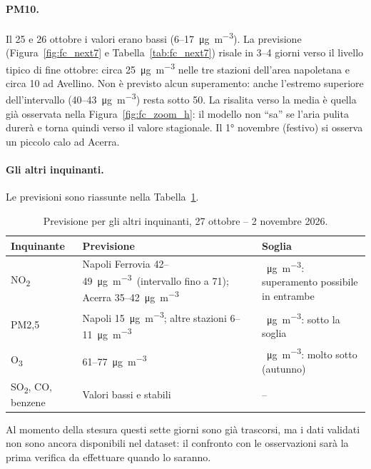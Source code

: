 \documentclass[11pt]{report}
\newcommand{\ugm}{\si{\micro\gram\per\cubic\metre}}
\begin{document}
\paragraph{PM10.} Il 25 e 26 ottobre i valori erano bassi
(6--\SI{17}{\micro\gram\per\cubic\metre}). La previsione
(Figura~\ref{fig:fc_next7} e Tabella~\ref{tab:fc_next7}) risale in 3--4 giorni
verso il livello tipico di fine ottobre: circa
\SI{25}{\micro\gram\per\cubic\metre} nelle tre stazioni dell'area napoletana e circa
10 ad Avellino. Non è previsto alcun superamento: anche l'estremo superiore
dell'intervallo (40--\SI{43}{\micro\gram\per\cubic\metre}) resta sotto 50. La
risalita verso la media è quella già osservata nella Figura~\ref{fig:fc_zoom_h}: il
modello non ``sa'' se l'aria pulita durerà e torna quindi verso il valore
stagionale. Il 1° novembre (festivo) si osserva un piccolo calo ad Acerra.

\paragraph{Gli altri inquinanti.} Le previsioni sono riassunte nella
Tabella~\ref{tab:fc_next7_altri}.

\begin{table}[H]
  \centering
  \caption{Previsione per gli altri inquinanti, 27 ottobre -- 2 novembre 2026.}
  \label{tab:fc_next7_altri}
  \small
  \begin{tabularx}{\textwidth}{@{}l X >{\raggedright\arraybackslash}p{4cm}@{}}
    \toprule
    \textbf{Inquinante} & \textbf{Previsione} & \textbf{Soglia} \\
    \midrule
    NO\textsubscript{2} & Napoli Ferrovia 42--49~\ugm\ (intervallo fino a 71); Acerra 35--42~\ugm & 50~\ugm: superamento possibile in entrambe \\
    \addlinespace
    PM2,5 & Napoli 15~\ugm; altre stazioni 6--11~\ugm & 25~\ugm: sotto la soglia \\
    \addlinespace
    O\textsubscript{3} & 61--77~\ugm & 120~\ugm: molto sotto (autunno) \\
    \addlinespace
    SO\textsubscript{2}, CO, benzene & Valori bassi e stabili & -- \\
    \bottomrule
  \end{tabularx}
\end{table}

Al momento della stesura questi sette giorni sono già trascorsi, ma i dati validati
non sono ancora disponibili nel dataset: il confronto con le osservazioni sarà la
prima verifica da effettuare quando lo saranno.
\end{document}
